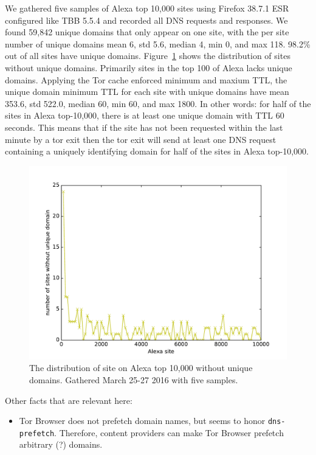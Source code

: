 We gathered five samples of Alexa top 10,000 sites using Firefox 38.7.1 ESR
configured like TBB 5.5.4 and recorded all DNS requests and responses.
We found 59,842 unique domains that only appear on one site, with the per site
number of unique domains mean 6, std 5.6, median 4, min 0, and max 118.
98.2\% out of all sites have unique domains.
Figure~\ref{fig:dns-unique-domains-ff} shows the distribution of sites
without unique domains. Primarily sites in the top 100 of Alexa lacks unique
domains. Applying the Tor cache enforced minimum and maxium TTL, the unique
domain minimum TTL for each site with unique domains have mean 353.6, std 522.0,
median 60, min 60, and max 1800. In other words: for half of the sites in
Alexa top-10,000, there is at least one unique domain with TTL 60 seconds.
This means that if the site has not been requested within the last minute
by a tor exit then the tor exit will send at least one DNS request containing
a uniquely identifying domain for half of the sites in Alexa top-10,000. 

\begin{figure}[t]
	\centering
	\includegraphics[width=\linewidth]{figures/dns-unique-domains}
	\caption{The distribution of site on Alexa top 10,000 without unique domains.
	Gathered March 25-27 2016 with five samples.}
	\label{fig:dns-unique-domains-ff}
\end{figure}

Other facts that are relevant here:
\begin{itemize}
	\item Tor Browser does not prefetch domain names, but seems to honor
		\texttt{dns-prefetch}.  Therefore, content providers can make Tor
		Browser prefetch arbitrary (?) domains.
\end{itemize}
